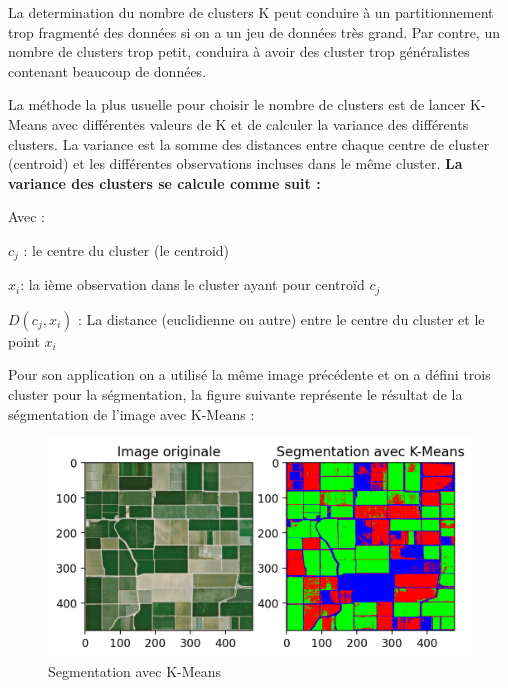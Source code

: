 \documentclass[12pt, openany]{report}
\begin{document}
La determination du nombre de clusters K peut conduire à un partitionnement trop fragmenté des données si on a un jeu de données très grand. Par contre, un nombre de clusters trop petit, conduira à avoir des cluster trop généralistes contenant beaucoup de données.

La méthode la plus usuelle pour choisir le nombre de clusters est de lancer K-Means avec différentes valeurs de K et de calculer la variance des différents clusters.  La variance est la somme des distances entre chaque centre de cluster (centroid) et les différentes observations incluses dans le même cluster. 
\newline
\textbf{ La variance des clusters se calcule comme suit :\\}
    
Avec :
\begin{mylist}


\item $c_j$ : le centre du cluster (le centroid)
\item $x_i$: la ième observation dans le cluster ayant pour centroïd $c_j$
\item $D(c_j,x_i)$ : La distance (euclidienne ou autre) entre le centre du cluster et le point $x_i$
\end{mylist}


\par
Pour son application on a utilisé la même image précédente et on a défini trois cluster pour la ségmentation, la figure suivante représente le résultat de la ségmentation de l'image avec K-Means : 

\begin{figure}[H]
\centering
\includegraphics[scale=1.2]{kmeans.png}
\caption{Segmentation avec K-Means}
\end{figure}
\end{document}
